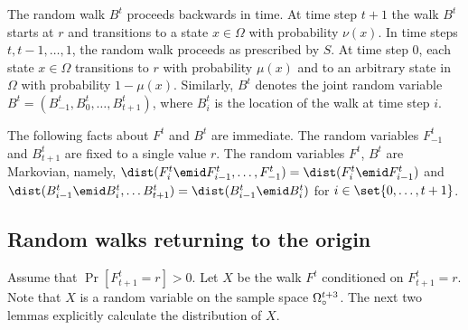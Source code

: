 The random walk $B^t$ proceeds backwards in time. At time 
step $t+1$ the walk $B^t$ starts at $r$ and transitions
to a state $x\in\Omega$ with probability $\nu(x)$.
In time
steps $t, t-1,\ldots, 1$, the random walk proceeds as prescribed
by $S$.
At time step $0$, each state $x\in\Omega$ transitions
to $r$ with probability $\mu(x)$
and to an arbitrary state in
$\Omega$ with probability $1-\mu(x)$.
Similarly, $B^t$ denotes
the joint random variable 
$B^t = (B^t_{-1},B^t_0,\ldots,B^t_{t+1})$,
where $B^t_i$ is the
location of the walk at time step $i$.

The following facts about $F^t$ and $B^t$ are immediate.
The random variables $F^t_{-1}$ and $B^t_{t+1}$ are fixed
to a single value $r$. The random variables $F^t$, $B^t$ are Markovian,
namely,
$\dist(F^t_i \emid F^t_{i-1},\ldots,F^t_{-1}) 
    = \dist(F^t_i \emid F^t_{i-1})$ and 
$\dist(B^t_{i-1} \emid B^t_{i},\ldots B^t_{t+1})
    = \dist(B^t_{i-1} \emid B^t_{i})$ for 
$i\in \set{0,\ldots, t+1}$.


\subsection{Random walks returning to the origin}
Assume that $\Pr[F^t_{t+1}=r]>0$.
Let $X$ be the walk $F^t$ conditioned on
$F^t_{t+1} = r$.
Note that $X$ is a random variable on the sample space
$\Omega_\circ^{t+3}$. The next two lemmas explicitly calculate 
the distribution of $X$.

